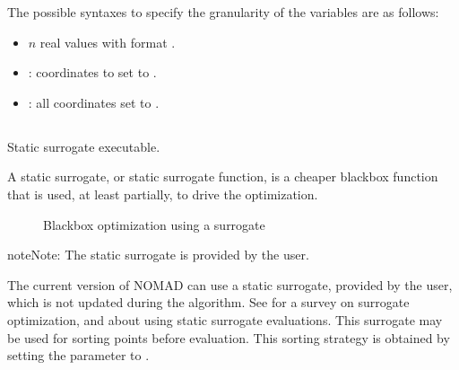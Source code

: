 \documentclass[letterpaper,10pt,english]{sphinxmanual}
\begin{document}
\sphinxAtStartPar
The possible syntaxes to specify the granularity of the variables are as follows:
\begin{itemize}
\item {} 
\sphinxAtStartPar
\(n\) real values with format .

\item {} 
\sphinxAtStartPar
{}: coordinates   to   set to .

\item {} 
\sphinxAtStartPar
{}: all coordinates set to .

\end{itemize}


\subsection{}
\label{\detokenize{AdvancedFunctionalities:surrogate-exe}}\label{\detokenize{AdvancedFunctionalities:id11}}
\sphinxAtStartPar
Static surrogate executable.

\sphinxAtStartPar
A static surrogate, or static surrogate function, is a cheaper blackbox function that is used, at least partially, to drive the optimization.

\begin{figure}[htbp]
\centering
\capstart

\noindent{}
\caption{Blackbox optimization using a surrogate}\label{\detokenize{AdvancedFunctionalities:id18}}\end{figure}

\begin{sphinxadmonition}{note}{Note:}
\sphinxAtStartPar
The static surrogate is provided by the user.
\end{sphinxadmonition}

\sphinxAtStartPar
The current version of NOMAD can use a static surrogate, provided by the user, which is not updated during the algorithm. See  for a survey on surrogate optimization, and  about using static surrogate evaluations. This surrogate may be used for sorting points before evaluation. This sorting strategy is obtained by setting the parameter {\hyperref[\detokenize{AdvancedFunctionalities:eval-queue-sort}]{}} to .
\end{document}
